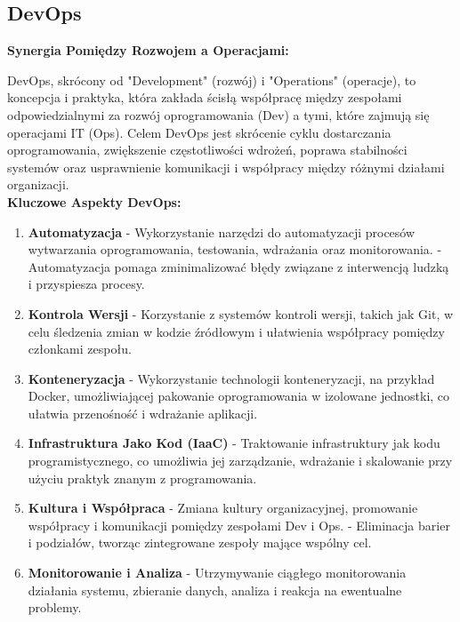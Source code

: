 \subsection{DevOps}

{\bf Synergia Pomiędzy Rozwojem a Operacjami:}

\noindent DevOps, skrócony od "Development" (rozwój) i "Operations" (operacje), to koncepcja i praktyka, która zakłada ścisłą współpracę między zespołami odpowiedzialnymi za rozwój oprogramowania (Dev) a tymi, które zajmują się operacjami IT (Ops). Celem DevOps jest skrócenie cyklu dostarczania oprogramowania, zwiększenie częstotliwości wdrożeń, poprawa stabilności systemów oraz usprawnienie komunikacji i współpracy między różnymi działami organizacji.
\\

{\noindent\bf Kluczowe Aspekty DevOps:} 
\begin{enumerate}
\item {\bf Automatyzacja}
   - Wykorzystanie narzędzi do automatyzacji procesów wytwarzania oprogramowania, testowania, wdrażania oraz monitorowania.
   - Automatyzacja pomaga zminimalizować błędy związane z interwencją ludzką i przyspiesza procesy.

\item {\bf Kontrola Wersji}
   - Korzystanie z systemów kontroli wersji, takich jak Git, w celu śledzenia zmian w kodzie źródłowym i ułatwienia współpracy pomiędzy członkami zespołu.

\item {\bf Konteneryzacja}
   - Wykorzystanie technologii konteneryzacji, na przykład Docker, umożliwiającej pakowanie oprogramowania w izolowane jednostki, co ułatwia przenośność i wdrażanie aplikacji.

\item {\bf Infrastruktura Jako Kod (IaaC)}
   - Traktowanie infrastruktury jak kodu programistycznego, co umożliwia jej zarządzanie, wdrażanie i skalowanie przy użyciu praktyk znanym z programowania.

\item {\bf Kultura i Współpraca}
   - Zmiana kultury organizacyjnej, promowanie współpracy i komunikacji pomiędzy zespołami Dev i Ops.
   - Eliminacja barier i podziałów, tworząc zintegrowane zespoły mające wspólny cel.

\item {\bf Monitorowanie i Analiza}
   - Utrzymywanie ciągłego monitorowania działania systemu, zbieranie danych, analiza i reakcja na ewentualne problemy.
\end{enumerate}

